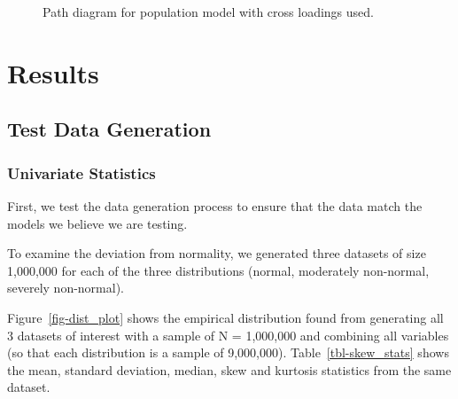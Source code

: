 \documentclass[
  letterpaper,
  DIV=11,
  numbers=noendperiod]{scrartcl}
\begin{document}
\begin{figure}[H]


\caption{\label{fig-pop_model_2}Path diagram for population model with
cross loadings used.}

\end{figure}%

\section{Results}\label{results}

\subsection{Test Data Generation}\label{test-data-generation}

\subsubsection{Univariate Statistics}\label{univariate-statistics}

First, we test the data generation process to ensure that the data match
the models we believe we are testing.

To examine the deviation from normality, we generated three datasets of
size 1,000,000 for each of the three distributions (normal, moderately
non-normal, severely non-normal).

Figure~\ref{fig-dist_plot} shows the empirical distribution found from
generating all 3 datasets of interest with a sample of N = 1,000,000 and
combining all variables (so that each distribution is a sample of
9,000,000). Table~\ref{tbl-skew_stats} shows the mean, standard
deviation, median, skew and kurtosis statistics from the same dataset.
\end{document}
